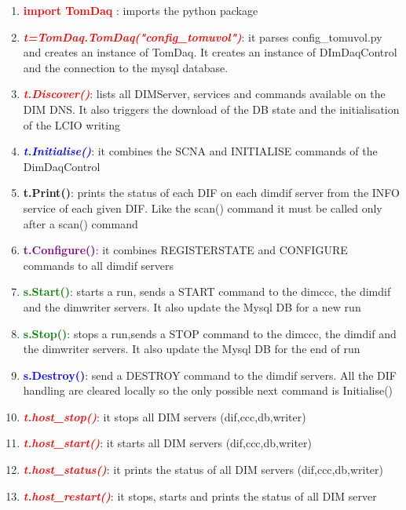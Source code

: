 \documentclass[english]{article}
\begin{document}
\begin{enumerate} 
\item \textcolor{red}{ \bf  import TomDaq} :  imports the python package

\item \textcolor{red}{\it \bf t=TomDaq.TomDaq("config\_tomuvol")}:  it parses config\_tomuvol.py and creates an instance of TomDaq. It creates an instance of DImDaqControl and the connection to the mysql database.

\item \textcolor{red}{\it \bf t.Discover()}: lists all DIMServer, services and commands available on the DIM DNS. It also triggers the download of the DB state and the initialisation of the LCIO writing
  

\item \textcolor{blue}{\it {\bf t.Initialise()}}: it combines the SCNA and INITIALISE commands of the DimDaqControl

\item {\bf t.Print()}: prints the status of each DIF on each dimdif server from the INFO service of each given DIF. Like the scan() command it must be called only after a scan() command



\item \textcolor{purple}{\bf t.Configure()}: it combines REGISTERSTATE and CONFIGURE commands to all dimdif servers




\item \textcolor{green}{\bf s.Start()}: starts a run, sends a START command to the dimccc, the dimdif and the dimwriter servers. It also update the Mysql DB for a new run 

\item \textcolor{green}{\bf s.Stop()}: stops a run,sends a STOP command to the dimccc, the dimdif and the dimwriter servers. It also update the Mysql DB for the end of run 
\item \textcolor{blue}{\bf s.Destroy()}: send a DESTROY command to the dimdif servers. All the DIF handling are cleared locally so the only possible next command is Initialise()

\item \textcolor{red}{\it \bf t.host\_stop()}: it stops all DIM servers (dif,ccc,db,writer)

\item \textcolor{red}{\it \bf t.host\_start()}: it starts all DIM servers (dif,ccc,db,writer)

\item \textcolor{red}{\it \bf t.host\_status()}: it prints the status of all DIM servers (dif,ccc,db,writer)

\item \textcolor{red}{\it \bf t.host\_restart()}: it stops, starts and prints the status of all DIM server

\end{enumerate} 
\end{document}
